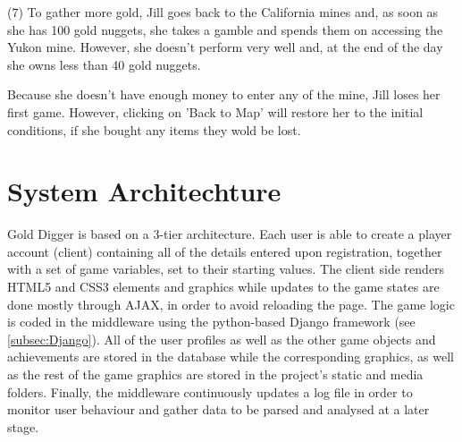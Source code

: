 \documentclass{mproj}
\begin{document}
(7) To gather more gold, Jill goes back to the California mines and, as soon as she has 100 gold nuggets, she takes a gamble and spends them on accessing the Yukon mine. However, she doesn't perform very well and, at the end of the day she owns less than 40 gold nuggets.
\begin{figure} [h] 
	\centering
\end{figure}
Because she doesn't have enough money to enter any of the mine, Jill loses her first game. However, clicking on 'Back to Map' will restore her to the initial conditions, if she bought any items they wold be lost.
\section{System Architechture}

\begin{figure} [h] 
	\centering
\end{figure}

Gold Digger is based on a 3-tier architecture. Each user is able to create a player account (client) containing all of the details entered upon registration, together with a set of game variables, set to their starting values. The client side renders HTML5 and CSS3 elements and graphics while updates to the game states are done mostly through AJAX, in order to avoid reloading the page. The game logic is coded in the middleware using the python-based Django framework (see \ref {subsec:Django}). All of the user profiles as well as the other game objects and achievements are stored in the database while the corresponding graphics, as well as the rest of the game graphics are stored in the project's static and media folders. Finally, the middleware continuously updates a log file in order to monitor user behaviour and gather data to be parsed and analysed at a later stage.
\end{document}
